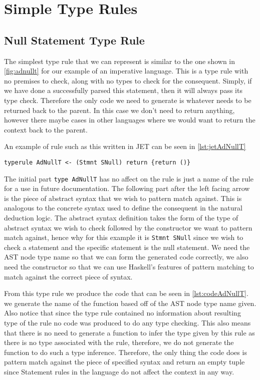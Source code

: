 \section{Simple Type Rules}
\subsection{Null Statement Type Rule}
The simplest type rule that we can represent is similar to the one shown in \autoref{fig:adnullt} for our example of an imperative language.
This is a type rule with no premises to check, along with no types to check for the consequent.
Simply, if we have done a successfully parsed this statement, then it will always pass its type check.
Therefore the only code we need to generate is whatever needs to be returned back to the parent.
In this case we don't need to return anything, however there maybe cases in other languages where we would want to return the context back to the parent.

An example of rule such as this written in JET can be seen in \autoref{lst:jetAdNullT}
\begin{lstlisting}[caption = JET type rule for null statement, label=lst:jetAdNullT]
typerule AdNullT <- (Stmnt SNull) return {return ()}
\end{lstlisting}

The initial part \texttt{type AdNullT} has no affect on the rule is just a name of the rule for a use in future documentation.
The following part after the left facing arrow is the piece of abstract syntax that we wish to pattern match against.
This is analogous to the concrete syntax used to define the consequent in the natural deduction logic.
The abstract syntax definition takes the form of the type of abstract syntax we wish to check followed by the constructor we want to pattern match against, hence why for this example it is \texttt{Stmnt SNull} since we wish to check a statement and the specific statement is the null statement.
We need the AST node type name so that we can form the generated code correctly, we also need the constructor so that we can use Haskell's features of pattern matching to match against the correct piece of syntax.

From this type rule we produce the code that can be seen in \autoref{lst:codeAdNullT}.
we generate the name of the function based off of the AST node type name given.
Also notice that since the type rule contained no information about resulting type of the rule no code was produced to do any type checking.
This also means that there is no need to generate a function to infer the type given by this rule as there is no type associated with the rule, therefore, we do not generate the function to do such a type inference.
Therefore, the only thing the code does is pattern match against the piece of specified syntax and return an empty tuple since Statement rules in the language do not affect the context in any way.

